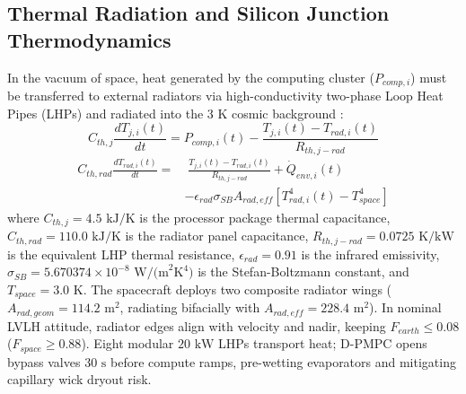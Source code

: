 \documentclass[journal]{IEEEtran}
\begin{document}
\subsection{Thermal Radiation and Silicon Junction Thermodynamics}
In the vacuum of space, heat generated by the computing cluster ($P_{comp,i}$) must be transferred to external radiators via high-conductivity two-phase Loop Heat Pipes (LHPs) and radiated into the 3 K cosmic background \cite{gilmore2002spacecraft, skadron2004temperature}:
\begin{equation}
    C_{th,j} \frac{d T_{j,i}(t)}{dt} = P_{comp,i}(t) - \frac{T_{j,i}(t) - T_{rad,i}(t)}{R_{th,j-rad}}
    \label{eq:thermal_junction}
\end{equation}
\begin{equation}
\begin{split}
    C_{th,rad} \frac{d T_{rad,i}(t)}{dt} = & \; \frac{T_{j,i}(t) - T_{rad,i}(t)}{R_{th,j-rad}} + \dot{Q}_{env,i}(t) \\
    & - \epsilon_{rad} \sigma_{SB} A_{rad,eff} [T_{rad,i}^4(t) - T_{space}^4]
\end{split}
\label{eq:thermal_radiator}
\end{equation}
where $C_{th,j} = 4.5\text{ kJ/K}$ is the processor package thermal capacitance, $C_{th,rad} = 110.0\text{ kJ/K}$ is the radiator panel capacitance, $R_{th,j-rad} = 0.0725\text{ K/kW}$ is the equivalent LHP thermal resistance, $\epsilon_{rad} = 0.91$ is the infrared emissivity, $\sigma_{SB} = 5.670374 \times 10^{-8}\text{ W/(m}^2\text{K}^4)$ is the Stefan-Boltzmann constant, and $T_{space} = 3.0\text{ K}$. The spacecraft deploys two composite radiator wings ($A_{rad,geom} = 114.2\text{ m}^2$, radiating bifacially with $A_{rad,eff} = 228.4\text{ m}^2$). In nominal LVLH attitude, radiator edges align with velocity and nadir, keeping $F_{earth} \le 0.08$ ($F_{space} \ge 0.88$). Eight modular $20\text{ kW}$ LHPs transport heat; D-PMPC opens bypass valves $30\text{ s}$ before compute ramps, pre-wetting evaporators and mitigating capillary wick dryout risk.
\end{document}
